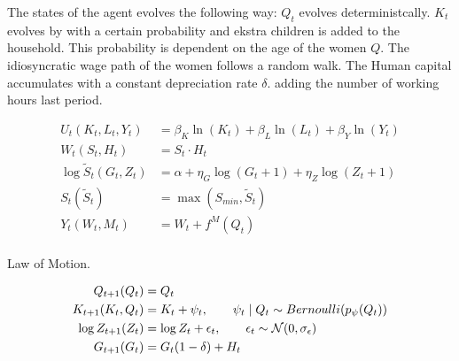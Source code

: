 The states of the agent evolves the following way: $Q_t$ evolves deterministcally. $K_t$ evolves by with a certain probability and ekstra children is added to the household. This probability is dependent on the age of the women $Q$. The idiosyncratic wage path of the women follows a random walk. The Human capital accumulates with a constant depreciation rate $\delta$. adding the number of working hours last period.

\begin{align}
    U_t(K_t, L_t, Y_t) &= \beta_K \ln(K_t) + \beta_L \ln(L_t) + \beta_Y \ln(Y_t) \\
    W_t(S_t, H_t) &= S_t \cdot H_t \\
    \log \tilde{S}_t (G_t, Z_t) &= \alpha + \eta_G \log(G_t + 1) + \eta_Z \log (Z_t + 1) \\
    S_t(\tilde{S}_t) &= \max(S_{min} , \tilde{S}_t)  \\
    Y_t(W_t, M_t) &= W_t + f^M(Q_t)\\
\end{align}


Law of Motion.

\begin{align}
    Q_{t+1}(Q_t) &= Q_t \\
    K_{t+1}(K_t, Q_t)  &= K_{t} + \psi_t, \qquad \psi_t \mid Q_t \sim Bernoulli(p_\psi(Q_t)) \\
    \log Z_{t+1}(Z_t) &= \log Z_t + \epsilon_t, \qquad \epsilon_t \sim \mathcal{N}(0, \sigma_\epsilon) \\
    G_{t+1}(G_t) &= G_t(1 - \delta) + H_t \\
\end{align}


